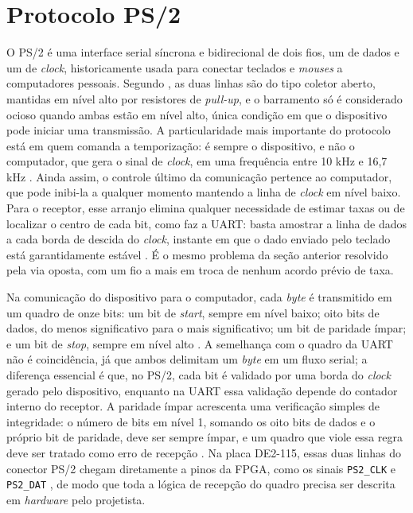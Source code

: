 \documentclass[
	12pt,
	oneside,
	a4paper,
	english,
	french,
	spanish,
	brazil,
	]{abntex2}
\begin{document}
\section{Protocolo PS/2}
\label{sec:protocolo_ps2}
O PS/2 é uma interface serial síncrona e bidirecional de dois fios, um de dados e um de \emph{clock}, historicamente usada para conectar teclados e \emph{mouses} a computadores pessoais. Segundo , as duas linhas são do tipo coletor aberto, mantidas em nível alto por resistores de \emph{pull-up}, e o barramento só é considerado ocioso quando ambas estão em nível alto, única condição em que o dispositivo pode iniciar uma transmissão. A particularidade mais importante do protocolo está em quem comanda a temporização: é sempre o dispositivo, e não o computador, que gera o sinal de \emph{clock}, em uma frequência entre 10 kHz e 16,7 kHz \cite{chapweske_ps2}. Ainda assim, o controle último da comunicação pertence ao computador, que pode inibi-la a qualquer momento mantendo a linha de \emph{clock} em nível baixo. Para o receptor, esse arranjo elimina qualquer necessidade de estimar taxas ou de localizar o centro de cada bit, como faz a UART: basta amostrar a linha de dados a cada borda de descida do \emph{clock}, instante em que o dado enviado pelo teclado está garantidamente estável \cite{chapweske_ps2}. É o mesmo problema da seção anterior resolvido pela via oposta, com um fio a mais em troca de nenhum acordo prévio de taxa.

Na comunicação do dispositivo para o computador, cada \emph{byte} é transmitido em um quadro de onze bits: um bit de \emph{start}, sempre em nível baixo; oito bits de dados, do menos significativo para o mais significativo; um bit de paridade ímpar; e um bit de \emph{stop}, sempre em nível alto \cite{chapweske_ps2}. A semelhança com o quadro da UART não é coincidência, já que ambos delimitam um \emph{byte} em um fluxo serial; a diferença essencial é que, no PS/2, cada bit é validado por uma borda do \emph{clock} gerado pelo dispositivo, enquanto na UART essa validação depende do contador interno do receptor. A paridade ímpar acrescenta uma verificação simples de integridade: o número de bits em nível 1, somando os oito bits de dados e o próprio bit de paridade, deve ser sempre ímpar, e um quadro que viole essa regra deve ser tratado como erro de recepção \cite{chapweske_ps2}. Na placa DE2-115, essas duas linhas do conector PS/2 chegam diretamente a pinos da FPGA, como os sinais \texttt{PS2\_CLK} e \texttt{PS2\_DAT} \cite{ManualFPGA}, de modo que toda a lógica de recepção do quadro precisa ser descrita em \emph{hardware} pelo projetista.
\end{document}
